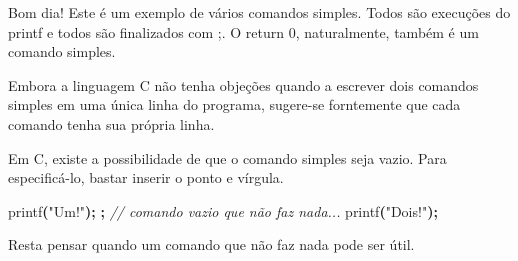 \documentclass[
  11pt,
  a4paper,
]{scrbook}
\newenvironment{Shaded}{\begin{snugshade}}{\end{snugshade}}
\newcommand{\CommentTok}[1]{\textcolor[rgb]{0.56,0.35,0.01}{\textit{#1}}}
\newcommand{\NormalTok}[1]{#1}
\newcommand{\OperatorTok}[1]{\textcolor[rgb]{0.81,0.36,0.00}{\textbf{#1}}}
\newcommand{\StringTok}[1]{\textcolor[rgb]{0.31,0.60,0.02}{#1}}
\begin{document}
\begin{Shaded}
\begin{Highlighting}[]
\NormalTok{Bom dia! Este é um exemplo de vários comandos simples.}
\NormalTok{Todos são execuções do printf e todos são finalizados com \textquotesingle{};\textquotesingle{}.}
\NormalTok{O \textquotesingle{}return 0\textquotesingle{}, naturalmente, também é um comando simples.}
\end{Highlighting}
\end{Shaded}

\begin{tcolorbox}[enhanced jigsaw, arc=.35mm, bottomtitle=1mm, colbacktitle=quarto-callout-tip-color!10!white, title=\textcolor{quarto-callout-tip-color}{\faLightbulb}\hspace{0.5em}{Dica}, toprule=.15mm, left=2mm, opacityback=0, colback=white, colframe=quarto-callout-tip-color-frame, opacitybacktitle=0.6, bottomrule=.15mm, leftrule=.75mm, toptitle=1mm, coltitle=black, titlerule=0mm, rightrule=.15mm, breakable]

Embora a linguagem C não tenha objeções quando a escrever dois comandos
simples em uma única linha do programa, sugere-se forntemente que cada
comando tenha sua própria linha.

\end{tcolorbox}

\begin{tcolorbox}[enhanced jigsaw, arc=.35mm, bottomtitle=1mm, colbacktitle=quarto-callout-warning-color!10!white, title={Curiosidade}, toprule=.15mm, left=2mm, opacityback=0, colback=white, colframe=quarto-callout-warning-color-frame, opacitybacktitle=0.6, bottomrule=.15mm, leftrule=.75mm, toptitle=1mm, coltitle=black, titlerule=0mm, rightrule=.15mm, breakable]

Em C, existe a possibilidade de que o comando simples seja vazio. Para
especificá-lo, bastar inserir o ponto e vírgula.

\begin{Shaded}
\begin{Highlighting}[]
\NormalTok{    printf}\OperatorTok{(}\StringTok{"Um!"}\OperatorTok{);}
    \OperatorTok{;}  \CommentTok{// comando vazio que não faz nada...}
\NormalTok{    printf}\OperatorTok{(}\StringTok{"Dois!"}\OperatorTok{);}
\end{Highlighting}
\end{Shaded}

Resta pensar quando um comando que não faz nada pode ser útil.

\end{tcolorbox}
\end{document}
